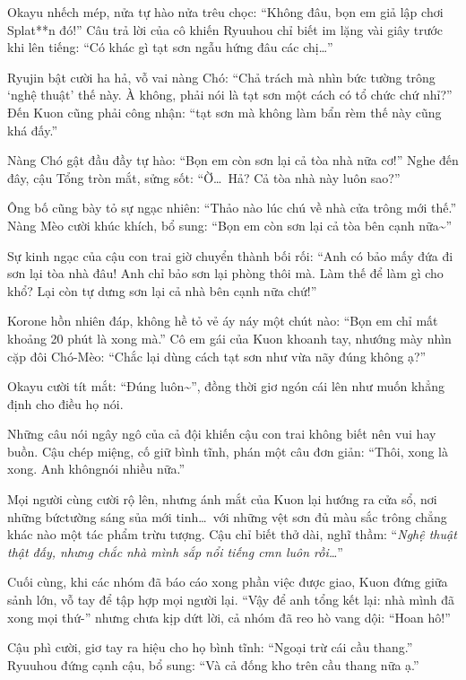 \documentclass[../main.tex]{subfiles}
\begin{document}
Okayu nhếch mép, nửa tự hào nửa trêu chọc: ``Không đâu, bọn em giả lập chơi Splat**n đó!'' Câu trả lời của cô khiến Ryuuhou chỉ biết im lặng vài giây trước khi lên tiếng: ``Có khác gì tạt sơn ngẫu hứng đâu các chị\dots''

Ryujin bật cười ha hả, vỗ vai nàng Chó: ``Chả trách mà nhìn bức tường trông `nghệ thuật' thế này. À không, phải nói là tạt sơn một cách có tổ chức chứ nhỉ?'' Đến Kuon cũng phải công nhận: ``tạt sơn mà không làm bẩn rèm thế này cũng khá đấy.''

Nàng Chó gật đầu đầy tự hào: ``Bọn em còn sơn lại cả tòa nhà nữa cơ!'' Nghe đến đây, cậu Tổng tròn mắt, sửng sốt: ``Ờ\dots\ Hả? Cả tòa nhà này luôn sao?''

Ông bố cũng bày tỏ sự ngạc nhiên: ``Thảo nào lúc chú về nhà cửa trông mới thế.'' Nàng Mèo cười khúc khích, bổ sung: ``Bọn em còn sơn lại cả tòa bên cạnh nữa\~{}''

Sự kinh ngạc của cậu con trai giờ chuyển thành bối rối: ``Anh có bảo mấy đứa đi sơn lại tòa nhà đâu! Anh chỉ bảo sơn lại phòng thôi mà. Làm thế để làm gì cho khổ? Lại còn tự dưng sơn lại cả nhà bên cạnh nữa chứ!''

Korone hồn nhiên đáp, không hề tỏ vẻ áy náy một chút nào: ``Bọn em chỉ mất khoảng 20 phút là xong mà.'' Cô em gái của Kuon khoanh tay, nhướng mày nhìn cặp đôi Chó-Mèo: ``Chắc lại dùng cách tạt sơn như vừa nãy đúng không ạ?''

Okayu cười tít mắt: ``Đúng luôn\~{}'', đồng thời giơ ngón cái lên như muốn khẳng định cho điều họ nói.

Những câu nói ngây ngô của cả đội khiến cậu con trai không biết nên vui hay buồn. Cậu chép miệng, cố giữ bình tĩnh, phán một câu đơn giản: ``Thôi, xong là xong. Anh khôngnói nhiều nữa.''

Mọi người cùng cười rộ lên, nhưng ánh mắt của Kuon lại hướng ra cửa sổ, nơi những bứctường sáng sủa mới tinh\dots\ với những vệt sơn đủ màu sắc trông chẳng khác nào một tác phẩm trừu tượng. Cậu chỉ biết thở dài, nghĩ thầm: ``\textit{Nghệ thuật thật đấy, nhưng chắc nhà mình sắp nổi tiếng cmn luôn rồi\dots}''

\ct

Cuối cùng, khi các nhóm đã báo cáo xong phần việc được giao, Kuon đứng giữa sảnh lớn, vỗ tay để tập hợp mọi người lại. ``Vậy để anh tổng kết lại: nhà mình đã xong mọi thứ-'' nhưng chưa kịp dứt lời, cả nhóm đã reo hò vang dội: ``Hoan hô!''

Cậu phì cười, giơ tay ra hiệu cho họ bình tĩnh: ``Ngoại trừ cái cầu thang.'' Ryuuhou đứng cạnh cậu, bổ sung: ``Và cả đống kho trên cầu thang nữa ạ.''
\end{document}
